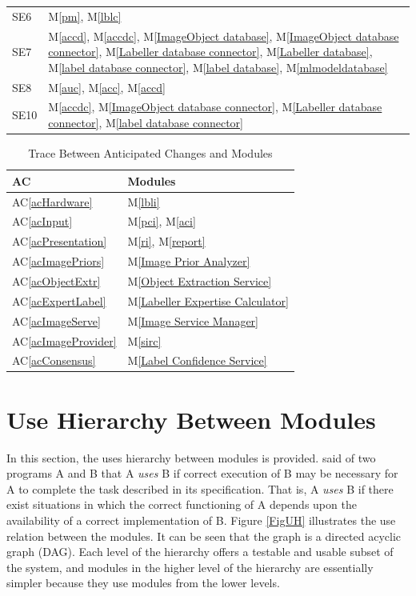 \documentclass[12pt, titlepage]{article}
\newcommand{\acref}[1]{AC\ref{#1}}
\newcommand{\mref}[1]{M\ref{#1}}
\begin{document}
\begin{longtable}{p{} p{}}
  SE6 & \mref{pm}, \mref{lblc} \\
  SE7 & \mref{accd}, \mref{accdc}, \mref{ImageObject database}, \mref{ImageObject database connector}, \mref{Labeller database connector}, \mref{Labeller database}, \mref{label database connector}, \mref{label database}, \mref{mlmodeldatabase} \\
  SE8 & \mref{auc}, \mref{acc}, \mref{accd} \\
  SE10 & \mref{accdc}, \mref{ImageObject database connector}, \mref{Labeller database connector}, \mref{label database connector} \\
  
\end{longtable}

\begin{table}[H]
\centering
\begin{tabular}{p{} p{}}
\toprule
\textbf{AC} & \textbf{Modules}\\
\midrule
\acref{acHardware} & \mref{lbli} \\
\acref{acInput} & \mref{pci}, \mref{aci}\\
\acref{acPresentation} & \mref{ri}, \mref{report} \\
\acref{acImagePriors} & \mref{Image Prior Analyzer}\\
\acref{acObjectExtr} & \mref{Object Extraction Service}\\
\acref{acExpertLabel} & \mref{Labeller Expertise Calculator}\\
\acref{acImageServe} & \mref{Image Service Manager}\\
\acref{acImageProvider} & \mref{sirc}\\
\acref{acConsensus} & \mref{Label Confidence Service}\\
\bottomrule

\end{tabular}
\caption{Trace Between Anticipated Changes and Modules}
\label{TblACT}
\end{table}

\section{Use Hierarchy Between Modules} \label{SecUse}

In this section, the uses hierarchy between modules is
provided. \citet{Parnas1978} said of two programs A and B that A {\em uses} B if
correct execution of B may be necessary for A to complete the task described in
its specification. That is, A {\em uses} B if there exist situations in which
the correct functioning of A depends upon the availability of a correct
implementation of B.  Figure \ref{FigUH} illustrates the use relation between
the modules. It can be seen that the graph is a directed acyclic graph
(DAG). Each level of the hierarchy offers a testable and usable subset of the
system, and modules in the higher level of the hierarchy are essentially simpler
because they use modules from the lower levels.
\end{document}
